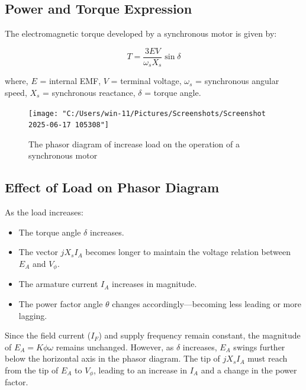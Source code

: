 \documentclass[a4paper,12pt]{article}
\begin{document}
\subsection*{Power and Torque Expression}

The electromagnetic torque developed by a synchronous motor is given by:

\begin{equation}
	T = \frac{3EV}{\omega_s X_s} \sin\delta
\end{equation}

where,  
$E$ = internal EMF,  
$V$ = terminal voltage,  
$\omega_s$ = synchronous angular speed,  
$X_s$ = synchronous reactance,  
$\delta$ = torque angle.
\begin{figure}[H]
	\centering
	\texttt{[image: "C:/Users/win-11/Pictures/Screenshots/Screenshot 2025-06-17 105308"]}
	\caption{The phasor diagram of increase load on the operation of a synchronous motor}
	\label{fig:screenshot-2025-06-17-105308}
\end{figure}

\subsection{Effect of Load on Phasor Diagram}

As the load increases:
\begin{itemize}
	\item The torque angle $\delta$ increases.
	\item The vector $jX_s I_A$ becomes longer to maintain the voltage relation between $E_A$ and $V_\phi$.
	\item The armature current $I_A$ increases in magnitude.
	\item The power factor angle $\theta$ changes accordingly—becoming less leading or more lagging.
\end{itemize}

Since the field current ($I_F$) and supply frequency remain constant, the magnitude of $E_A = K\phi\omega$ remains unchanged. However, as $\delta$ increases, $E_A$ swings further below the horizontal axis in the phasor diagram. The tip of $jX_s I_A$ must reach from the tip of $E_A$ to $V_\phi$, leading to an increase in $I_A$ and a change in the power factor.
\end{document}
